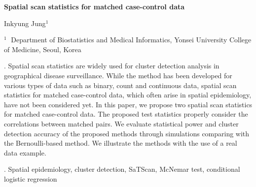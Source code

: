 \documentclass[12pt]{article}
\begin{document}
\begin{flushleft}


{\LARGE\bf Spatial scan statistics for matched case-control data}


\vspace{1.0cm}

Inkyung Jung$^1$

\begin{description}

\item $^1 \;$ Department of Biostatistics and Medical Informatics, Yonsei University College of Medicine,
Seoul, Korea

\end{description}

\end{flushleft}


\vspace{0.75cm}

. Spatial scan statistics are widely used for cluster detection analysis in geographical 
disease surveillance. While the method has been developed for various types of data such as binary, count and 
continuous data, spatial scan statistics for matched case-control data, which often arise in spatial epidemiology, 
have not been considered yet. In this paper, we propose two spatial scan statistics for matched case-control data. 
The proposed test statistics properly consider the correlations between matched pairs. We evaluate statistical power 
and cluster detection accuracy of the proposed methods through simulations comparing with the Bernoulli-based method. 
We illustrate the methods with the use of a real data example.

\vskip 2mm

.
Spatial epidemiology, cluster detection, SaTScan, McNemar test, conditional logistic regression
\end{document}
